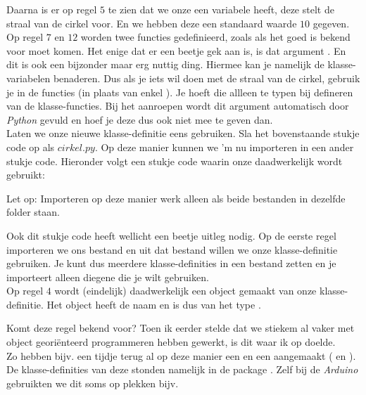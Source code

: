 Daarna is er op regel $5$ te zien dat we onze  een variabele  heeft, deze stelt de straal van de cirkel voor. En we hebben deze een standaard waarde $10$ gegeven. \\

Op regel $7$ en $12$ worden twee functies gedefinieerd, zoals als het goed is bekend voor moet komen. Het enige dat er een beetje gek aan is, is dat argument . En dit is ook een bijzonder maar erg nuttig ding. Hiermee kan je namelijk de klasse-variabelen benaderen. Dus als je iets wil doen met de straal van de cirkel, gebruik je in de functies  (in plaats van enkel ). Je hoeft die  allleen te typen bij defineren van de klasse-functies. Bij het aanroepen wordt dit argument automatisch door \textit{Python} gevuld en hoef je deze dus ook niet mee te geven dan. \\

Laten we onze nieuwe klasse-definitie eens gebruiken. Sla het bovenstaande stukje code op als $cirkel.py$. Op deze manier kunnen we 'm nu importeren in een ander stukje code. Hieronder volgt een stukje code waarin onze  daadwerkelijk wordt gebruikt:


\begin{remark}
Let op: Importeren op deze manier werk alleen als beide bestanden in dezelfde folder staan.
\end{remark}

Ook dit stukje code heeft wellicht een beetje uitleg nodig. Op de eerste regel importeren we ons bestand  en uit dat bestand willen we onze klasse-definitie  gebruiken. Je kunt dus meerdere klasse-definities in een bestand zetten en je importeert alleen diegene die je wilt gebruiken. \\ 

Op regel $4$ wordt (eindelijk) daadwerkelijk een object gemaakt van onze klasse-definitie. Het object heeft de naam  en is dus van het type . 

\begin{remark} 
Komt deze regel bekend voor? Toen ik eerder stelde dat we stiekem al vaker met object georiënteerd programmeren hebben gewerkt, is dit waar ik op doelde. \\
Zo hebben bijv. een tijdje terug al op deze manier een  en een  aangemaakt ( en ). De klasse-definities van deze stonden namelijk in de package . Zelf bij de \textit{Arduino} gebruikten we dit soms op plekken bijv. 
\end{remark}

